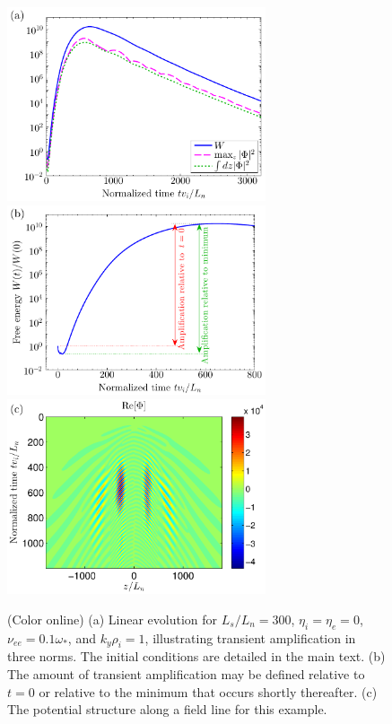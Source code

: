 \documentclass[12pt,superscriptaddress]{revtex4}
\begin{document}
\begin{figure}[h!]
\includegraphics[width=3in]{m20141119_01_plotGS2TransientAmplificationForPaper_figureA_a.pdf}
\includegraphics[width=3in]{m20141121_01_plotGS2TransientAmplificationForPaper_figuresBC_b.pdf}
\includegraphics[width=3in]{m20141121_01_plotGS2TransientAmplificationForPaper_figuresBC_c.pdf}
\caption{(Color online) (a) Linear evolution for $L_s/L_n=300$, $\eta_i = \eta_e = 0$,
$\nu_{ee} = 0.1 \omega_*$, and $k_y \rho_i = 1$, illustrating transient amplification in three norms.
The initial conditions are detailed in the main text.
(b) The amount of transient amplification may be defined relative to $t=0$ or relative
to the minimum that occurs shortly thereafter.
(c) The potential structure along a field line for this example.
\label{fig:transientAmplification}}
\end{figure}
\end{document}

